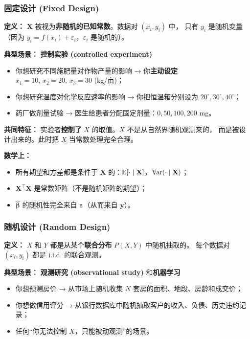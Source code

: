 \subsubsection{固定设计 (Fixed Design)}

\textbf{定义：} $\mathbf{X}$ 被视为\textbf{非随机的已知常数}。数据对 $(x_i, y_i)$ 中，
只有 $y_i$ 是随机变量（因为 $y_i = f(x_i) + \varepsilon_i$，$\varepsilon_i$ 是随机的）。

\textbf{典型场景：} \textbf{控制实验 (controlled experiment)}
\begin{itemize}
    \item 你想研究不同施肥量对作物产量的影响 → 你\textbf{主动设定} $x_1=10,\,x_2=20,\,x_3=30$ (kg/亩)；
    \item 你想研究温度对化学反应速率的影响 → 你把恒温箱分别设为 $20^\circ, 30^\circ, 40^\circ$；
    \item 药厂做剂量试验 → 医生给患者分配固定剂量：$0, 50, 100, 200$ mg。
\end{itemize}

\textbf{共同特征：} 实验者\textbf{控制了} $X$ 的取值。$X$ 不是从自然界随机观测来的，
而是被设计出来的。此时把 $X$ 当常数处理完全合理。

\textbf{数学上：}
\begin{itemize}
    \item 所有期望和方差都是条件于 $\mathbf{X}$ 的：$\mathbb{E}[\cdot \mid \mathbf{X}]$，$\mathrm{Var}(\cdot \mid \mathbf{X})$；
    \item $\mathbf{X}^\top \mathbf{X}$ 是常数矩阵（不是随机矩阵的期望）；
    \item $\hat{\bm{\beta}}$ 的随机性完全来自 $\bm{\varepsilon}$（从而来自 $\mathbf{y}$）。
\end{itemize}

\subsubsection{随机设计 (Random Design)}

\textbf{定义：} $X$ 和 $Y$ 都是从某个\textbf{联合分布} $P(X, Y)$ 中随机抽取的。
每个数据对 $(x_i, y_i)$ 都是 i.i.d. 的联合观测。

\textbf{典型场景：} \textbf{观测研究 (observational study)} 和\textbf{机器学习}
\begin{itemize}
    \item 你想预测房价 → 从市场上随机收集 $N$ 套房的面积、地段、房龄和成交价；
    \item 你想做信用评分 → 从银行数据库中随机抽取客户的收入、负债、历史违约记录；
    \item 任何``你无法控制 $X$，只能被动观测''的场景。
\end{itemize}

